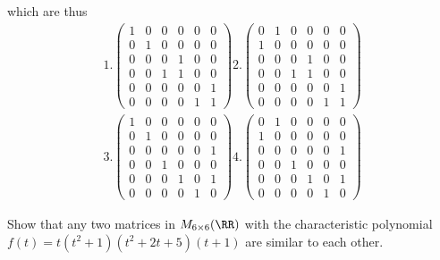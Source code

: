 \documentclass[11pt]{scrartcl}
\begin{document}
\begin{soln}
  which are thus
  \begin{align}
    1.\begin{pmatrix}
      1 & 0 & 0 & 0 & 0 & 0\\
      0 & 1 & 0 & 0 & 0 & 0\\
      0 & 0 & 0 & 1 & 0 & 0\\
      0 & 0 & 1 & 1 & 0 & 0\\
      0 & 0 & 0 & 0 & 0 & 1\\
      0 & 0 & 0 & 0 & 1 & 1
    \end{pmatrix}
                          2. 
    \begin{pmatrix}
      0 & 1 & 0 & 0 & 0 & 0\\
      1 & 0 & 0 & 0 & 0 & 0\\
      0 & 0 & 0 & 1 & 0 & 0\\
      0 & 0 & 1 & 1 & 0 & 0\\
      0 & 0 & 0 & 0 & 0 & 1\\
      0 & 0 & 0 & 0 & 1 & 1
    \end{pmatrix}\\
3.
    \begin{pmatrix}
      1 & 0 & 0 & 0 & 0 & 0\\
      0 & 1 & 0 & 0 & 0 & 0\\
      0 & 0 & 0 & 0 & 0 & 1\\
      0 & 0 & 1 & 0 & 0 & 0\\
      0 & 0 & 0 & 1 & 0 & 1\\
      0 & 0 & 0 & 0 & 1 & 0
    \end{pmatrix}
4.
    \begin{pmatrix}
      0 & 1 & 0 & 0 & 0 & 0\\
      1 & 0 & 0 & 0 & 0 & 0\\
      0 & 0 & 0 & 0 & 0 & 1\\
      0 & 0 & 1 & 0 & 0 & 0\\
      0 & 0 & 0 & 1 & 0 & 1\\
      0 & 0 & 0 & 0 & 1 & 0
    \end{pmatrix}
  \end{align}
\end{soln}

\begin{problem*}
  \hfill

  Show that any two matrices in $M_{6\times 6}(\RR)$ with the
  characteristic polynomial $f(t)=t(t^2+1)(t^2+2t+5)(t+1)$ are similar
  to each other.
\end{problem*}
\end{document}

